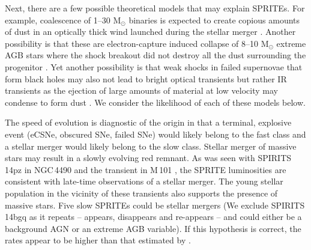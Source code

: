 \documentclass[twocolumn,times]{aastex6}
\begin{document}



Next, there are a few possible theoretical models that may explain SPRITEs. For example, coalescence of 1--30 M$_{\odot}$ 
binaries is expected to create copious amounts of dust in an optically thick wind launched during the stellar merger \citep{SokerTylenda2006,Ivanova2013,Nicholls2013,Pejcha2016}.  
Another possibility is that these are electron-capture induced collapse of 8--10 M$_{\odot}$
extreme AGB stars where the shock breakout did not destroy all the dust surrounding the progenitor \citep{Kochanek2011}. 
Yet another possibility is that weak shocks in failed supernovae that form black holes may also not lead to bright optical transients but
rather IR transients as the ejection of large amounts of material at low velocity may
condense to form dust \citep{Piro2013,Lovegrove2013}. We consider the likelihood of each of these models below. 

The speed of evolution is diagnostic of the origin in that a terminal, explosive event (eCSNe, obscured SNe,  failed SNe) would likely belong
to the fast class and a stellar merger would likely belong to the slow class.  Stellar merger of massive stars may 
result in a slowly evolving red remnant. As was seen with SPIRITS\,14pz in NGC\,4490 \citep{Smith2016} and the transient in M\,101 \citep{Blagorodnova2016}, 
the SPRITE luminosities are consistent with late-time observations of a stellar merger. The young stellar population in
the vicinity of these transients also supports the presence of massive stars. Five slow SPRITEs could be stellar mergers 
(We exclude SPIRITS\,14bgq as it repeats -- appears, disappears and re-appears -- and could either be a background AGN or an extreme AGB variable).
If this hypothesis is correct, the rates appear to be higher than that estimated by \citealt{Kochanek2014}. 
\end{document}
